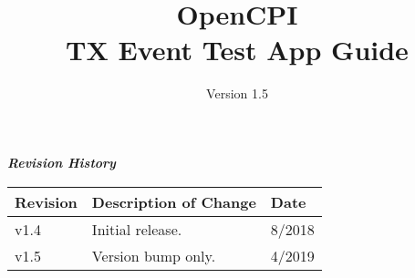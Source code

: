 \iffalse
This file is protected by Copyright. Please refer to the COPYRIGHT file
distributed with this source distribution.

This file is part of OpenCPI <http://www.opencpi.org>

OpenCPI is free software: you can redistribute it and/or modify it under the
terms of the GNU Lesser General Public License as published by the Free Software
Foundation, either version 3 of the License, or (at your option) any later
version.

OpenCPI is distributed in the hope that it will be useful, but WITHOUT ANY
WARRANTY; without even the implied warranty of MERCHANTABILITY or FITNESS FOR A
PARTICULAR PURPOSE. See the GNU Lesser General Public License for more details.

You should have received a copy of the GNU Lesser General Public License along
with this program. If not, see <http://www.gnu.org/licenses/>.
\fi

\def\docTitle{OpenCPI\\ TX Event Test App Guide}
\def\docVersion{1.5}
\def\snippetpath{../../../../../doc/av/tex/snippets}


\date{Version \docVersion} %
\title{\docTitle}
\usepackage{graphicx}
\graphicspath{ {figures/} }
\usepackage{textcomp}
\usepackage{listings}


\maketitle
	\begin{center}
	\textit{\textbf{Revision History}}
		\begin{table}[H]
		\label{table:revisions} %
\begin{longtable}{|p{}
                  |p{}
                  |p{}|}
			\hline
			\rowcolor{blue}
			\textbf{Revision} & \textbf{Description of Change} & \textbf{Date} \\
		    \hline
		    v1.4 & Initial release. & 8/2018 \\
		    \hline
		    v1.5 & Version bump only. & 4/2019 \\
			\hline
			\end{longtable}
		\end{table}
	\end{center}

